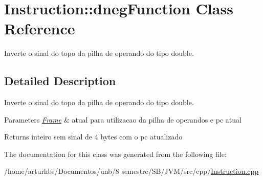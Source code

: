 \hypertarget{classInstruction_1_1dnegFunction}{}\section{Instruction\+:\+:dneg\+Function Class Reference}
\label{classInstruction_1_1dnegFunction}


Inverte o sinal do topo da pilha de operando do tipo double.  




\subsection{Detailed Description}
Inverte o sinal do topo da pilha de operando do tipo double. 


\begin{DoxyParams}{Parameters}
{\em \hyperlink{classFrame}{Frame}} & atual para utilizacao da pilha de operandos e pc atual \\
\hline
\end{DoxyParams}
\begin{DoxyReturn}{Returns}
inteiro sem sinal de 4 bytes com o pc atualizado 
\end{DoxyReturn}


The documentation for this class was generated from the following file\+:\begin{DoxyCompactItemize}
\item 
/home/arturhbs/\+Documentos/unb/8 semestre/\+S\+B/\+J\+V\+M/src/cpp/\hyperlink{Instruction_8cpp}{Instruction.\+cpp}\end{DoxyCompactItemize}
